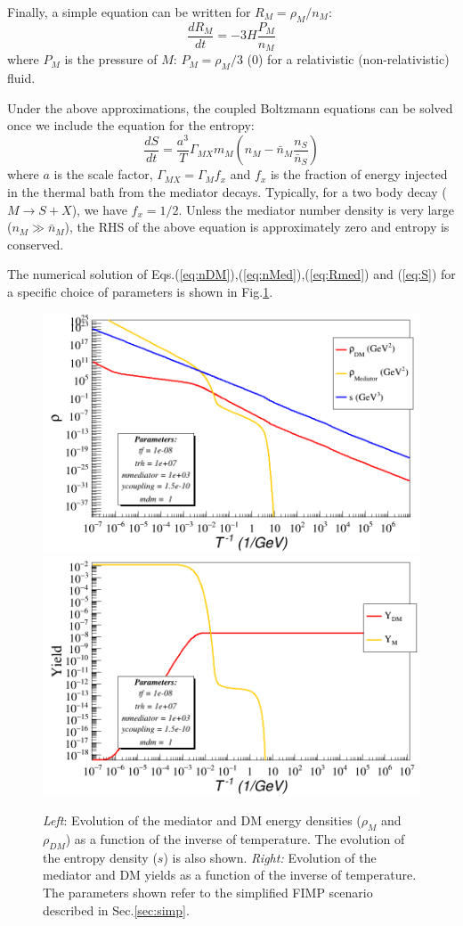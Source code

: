 \documentclass{article}
\def\to{\rightarrow}
\def\be{\begin{equation}}
\def\ee{\end{equation}}
\def\to{\rightarrow}
\newcommand\Drv[2]{\frac{d #1}{d #2}}
\begin{document}
Finally, a simple equation can be written for $R_M = \rho_M/n_M$:
\be
\Drv{R_M}{t} = -3 H \frac{P_M}{n_M} \label{eq:Rmed}
\ee
where $P_M$ is the pressure of $M$: $P_M = \rho_M/3$ ($0$) for a relativistic (non-relativistic) fluid.

Under the above approximations, the coupled Boltzmann equations can be solved once we include
the equation for the entropy:
\be
\Drv{S}{t} = \frac{a^3}{T} \Gamma_{MX} m_M \left(n_M -\bar{n}_M \frac{n_S}{\bar{n}_S}\right) \label{eq:S}
\ee
where $a$ is the scale factor, $\Gamma_{MX} = \Gamma_M f_x$ and $f_x$ is the fraction
of energy injected in the thermal bath from the mediator decays. Typically,
for a two body decay ($M \to S + X$), we have $f_x = 1/2$.
Unless the mediator number density is very large ($n_M \gg \bar{n}_M$), the RHS of the above equation is approximately
zero and entropy is conserved.

The numerical solution of Eqs.(\ref{eq:nDM}),(\ref{eq:nMed}),(\ref{eq:Rmed}) and (\ref{eq:S})
for a specific choice of parameters is shown in Fig.\ref{fig:solution1}.

\begin{figure}
\includegraphics[width=0.5\linewidth,clip]{test.png}
\includegraphics[width=0.5\linewidth,clip]{yield.png}
\caption{{\it Left}: Evolution of the mediator and DM energy densities ($\rho_M$ and $\rho_{DM}$)
as a function of the inverse of temperature. The evolution of the entropy density ($s$) is also shown.
{\it Right:} Evolution of the mediator and DM yields as a function of the inverse of temperature.
The parameters shown refer to the simplified FIMP scenario described in Sec.\ref{sec:simp}.
 \label{fig:solution1}}
\end{figure}
\end{document}
